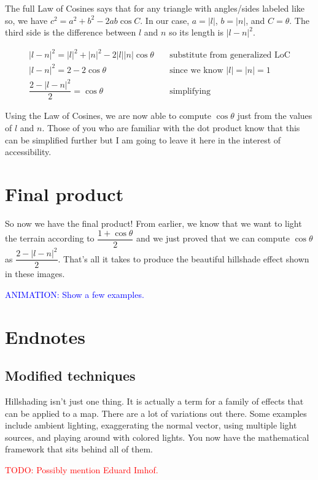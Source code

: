 \documentclass{article}
\newcommand\todo[1]{\textcolor{red}{TODO: #1}}
\newcommand\animation[1]{\textcolor{blue}{ANIMATION: #1}}
\begin{document}
The full Law of Cosines says that for any triangle with angles/sides labeled like so, we have $c^2 = a^2 + b^2 - 2ab \cos C$.
In our case, $a = |l|$, $b = |n|$, and $C = \theta$.
The third side is the difference between $l$ and $n$ so its length is $| l - n | ^ 2$.

\begin{align*}
|l-n|^2 = |l|^2 + |n|^2 - 2 |l| |n| \cos \theta & \quad \text{substitute from generalized LoC} \\
|l-n|^2 = 2 - 2 \cos \theta & \quad \text{since we know } |l| = |n| = 1 \\
\dfrac{2 - |l-n|^2}{2} = \cos \theta & \quad \text{simplifying}
\end{align*}

Using the Law of Cosines, we are now able to compute $\cos \theta$ just from the values of $l$ and $n$.
Those of you who are familiar with the dot product know that this can be simplified further but I am going to leave it here in the interest of accessibility.

\section{Final product}

So now we have the final product!
From earlier, we know that we want to light the terrain according to $\dfrac{1 + \cos \theta}{2}$ and we just proved that we can compute $\cos \theta$ as $\dfrac{2 - |l-n|^2}{2}$.
That's all it takes to produce the beautiful hillshade effect shown in these images.

\animation{Show a few examples.}

\section{Endnotes}

\subsection{Modified techniques}

Hillshading isn't just one thing.
It is actually a term for a family of effects that can be applied to a map.
There are a lot of variations out there.
Some examples include ambient lighting, exaggerating the normal vector, using multiple light sources, and playing around with colored lights.
You now have the mathematical framework that sits behind all of them.

\todo{Possibly mention Eduard Imhof.}
\end{document}
